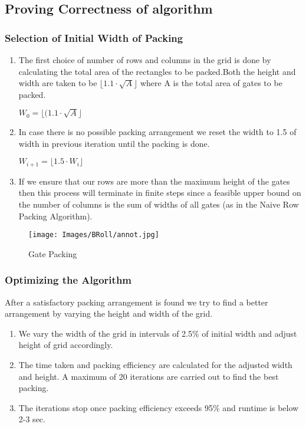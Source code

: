 \documentclass[12pt, a4paper,openany]{article}
\begin{document}
\subsection{Proving Correctness of algorithm}

\subsubsection{Selection of Initial Width of Packing}
\begin{enumerate}
    \item The first choice of number of rows and columns in the grid is done by calculating the total area of the rectangles to be packed.Both the height and width are taken to be $\lfloor 1.1 \cdot \sqrt{A} \rfloor$ where A is the total area of gates to be packed.
    \begin{center}
         $W_{0}=\lfloor(1.1\cdot\sqrt{A} \rfloor $
    \end{center}
    \item In case there is no possible packing arrangement we reset the width to 1.5 of width in previous iteration until the packing is done.
    \begin{center}
        $W_{i+1}=\lfloor 1.5 \cdot W_{i} \rfloor$ 
    \end{center}
    \item If we ensure that our rows are more than the maximum height of the gates then this process will terminate in finite steps since a feasible upper bound on the number of columns is the sum of widths of all gates (as in the Naive Row Packing Algorithm).
\end{enumerate}
\newpage
\begin{figure}[ht]
    \centering
    \begin{minipage}{.6\textwidth}
          
          \texttt{[image: Images/BRoll/annot.jpg]}
          \label{fig:annot-1}
          \caption{Gate Packing }
          
               
    \end{minipage}
\end{figure}


\subsubsection{Optimizing the Algorithm}

After a satisfactory packing arrangement is found we try to find a better arrangement by varying the height and width of the grid.
\begin{enumerate}
    \item We vary the width of the grid in intervals of 2.5\% of initial width and adjust height of grid accordingly.
    \item The time taken and packing efficiency are calculated for the adjusted width and height. A maximum of 20 iterations are carried out to find the best packing.
    \item The iterations stop once packing efficiency exceeds 95\% and runtime is below 2-3 sec.
\end{enumerate}
\end{document}
